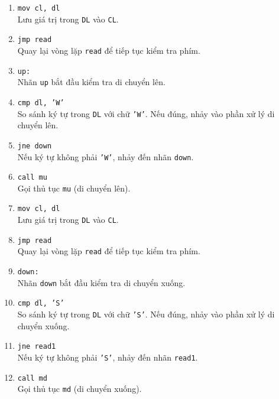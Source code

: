 \documentclass[12pt]{article}
\begin{document}
\begin{enumerate}[label=\textbf{\arabic*.}]
    \item \texttt{mov cl, dl} \\
    Lưu giá trị trong \texttt{DL} vào \texttt{CL}.
    
    \item \texttt{jmp read} \\
    Quay lại vòng lặp \texttt{read} để tiếp tục kiểm tra phím.

    \item \texttt{up:} \\
    Nhãn \texttt{up} bắt đầu kiểm tra di chuyển lên.
    
    \item \texttt{cmp dl, 'W'} \\
    So sánh ký tự trong \texttt{DL} với chữ \texttt{'W'}. Nếu đúng, nhảy vào phần xử lý di chuyển lên.
    
    \item \texttt{jne down} \\
    Nếu ký tự không phải \texttt{'W'}, nhảy đến nhãn \texttt{down}.
    
    \item \texttt{call mu} \\
    Gọi thủ tục \texttt{mu} (di chuyển lên).
    
    \item \texttt{mov cl, dl} \\
    Lưu giá trị trong \texttt{DL} vào \texttt{CL}.
    
    \item \texttt{jmp read} \\
    Quay lại vòng lặp \texttt{read} để tiếp tục kiểm tra phím.

    \item \texttt{down:} \\
    Nhãn \texttt{down} bắt đầu kiểm tra di chuyển xuống.
    
    \item \texttt{cmp dl, 'S'} \\
    So sánh ký tự trong \texttt{DL} với chữ \texttt{'S'}. Nếu đúng, nhảy vào phần xử lý di chuyển xuống.
    
    \item \texttt{jne read1} \\
    Nếu ký tự không phải \texttt{'S'}, nhảy đến nhãn \texttt{read1}.
    
    \item \texttt{call md} \\
    Gọi thủ tục \texttt{md} (di chuyển xuống).
    

\end{enumerate}
\end{document}

